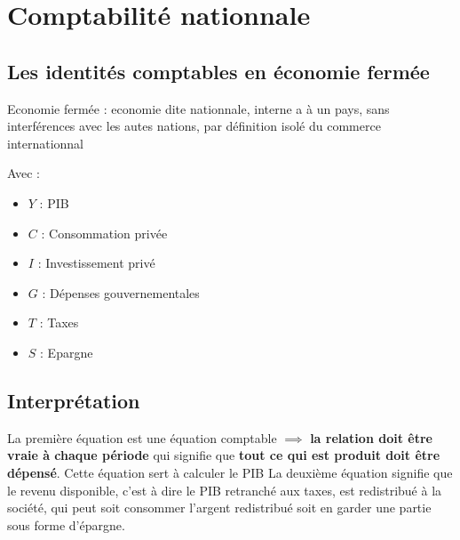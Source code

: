 \chapter{Comptabilité nationnale}
\section{Les identités comptables en économie fermée}
Economie fermée : economie dite nationnale, interne a à un pays, sans interférences avec les autes nations, par définition isolé du commerce internationnal
\begin{center}
    \Large{}
\end{center}
\begin{center}
    \Large{}
\end{center}
Avec : \begin{itemize}
    \item $Y$ : PIB
    \item $C$ : Consommation privée
    \item $I$ : Investissement privé
    \item $G$ : Dépenses gouvernementales
    \item $T$ : Taxes
    \item $S$ : Epargne
\end{itemize}
\newpage
\section{Interprétation}
La première équation est une équation comptable $\implies$ \textbf{la relation doit être vraie à chaque période} qui signifie que \textbf{tout ce qui est produit doit être dépensé}. Cette équation sert à calculer le PIB \newline
La deuxième équation signifie que le revenu disponible, c'est à dire le PIB retranché aux taxes, est redistribué à la société, qui peut soit consommer l'argent redistribué soit en garder une partie sous forme d'épargne.
